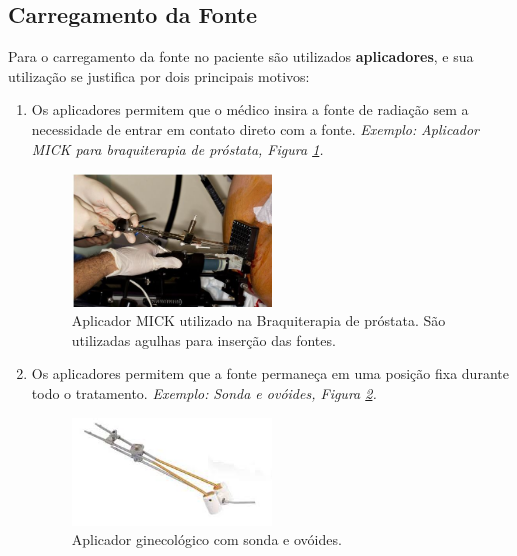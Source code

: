 \documentclass[11pt,a4paper]{article}
\begin{document}
		\subsection{Carregamento da Fonte}

			Para o carregamento da fonte no paciente são utilizados \textbf{aplicadores}, e sua utilização se justifica por dois principais motivos:

			\begin{enumerate}
				\item Os aplicadores permitem que o médico insira a fonte de radiação sem a necessidade de entrar em contato direto com a fonte. \textit{\textcolor{CarnationPink}{Exemplo:}} \textit{Aplicador MICK para braquiterapia de próstata, Figura \ref{img:aplicadorMick}.}

				\begin{figure}[h]
					\centering
					\includegraphics[width=0.5\textwidth]{Imagens/aplicadorMick.JPG}
					\caption{Aplicador MICK utilizado na Braquiterapia de próstata. São utilizadas agulhas para inserção das fontes.}
					\label{img:aplicadorMick}
				\end{figure}

				\item Os aplicadores permitem que a fonte permaneça em uma posição fixa durante todo o tratamento. \textit{\textcolor{CarnationPink}{Exemplo:}} \textit{Sonda e ovóides, Figura \ref{img:aplicadorSondaEOvoides}.}
				
				\begin{figure}[h]
					\centering
					\includegraphics[width=0.5\textwidth]{Imagens/aplicadorSondaEOvoides.jpg}
					\caption{Aplicador ginecológico com sonda e ovóides.}
					\label{img:aplicadorSondaEOvoides}
				\end{figure}
			\end{enumerate}
\end{document}
